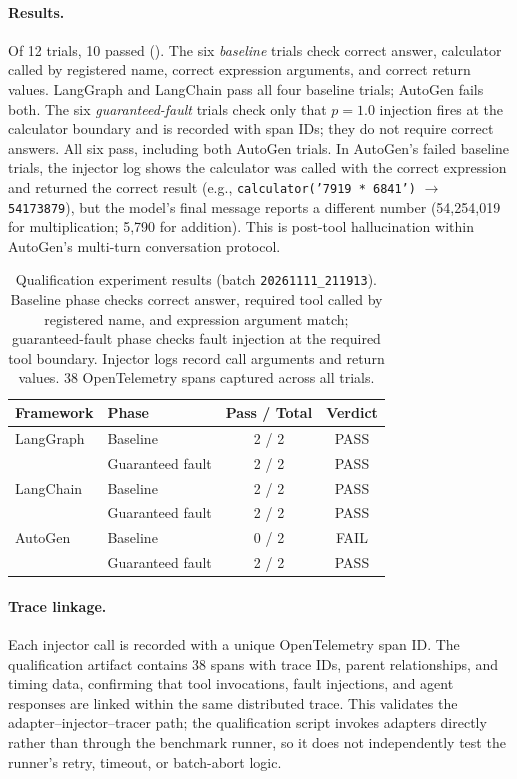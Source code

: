 \documentclass[make,article,submit,moreauthors,pdftex]{mdpi}
\begin{document}
{\color{orange}\paragraph{Results.} Of 12 trials, 10 passed (). The six \emph{baseline} trials check correct answer, calculator called by registered name, correct expression arguments, and correct return values. LangGraph and LangChain pass all four baseline trials; AutoGen fails both. The six \emph{guaranteed-fault} trials check only that $p = 1.0$ injection fires at the calculator boundary and is recorded with span IDs; they do not require correct answers. All six pass, including both AutoGen trials. In AutoGen's failed baseline trials, the injector log shows the calculator was called with the correct expression and returned the correct result (e.g., \texttt{calculator('7919 * 6841')} $\to$ \texttt{54173879}), but the model's final message reports a different number (54{,}254{,}019 for multiplication; 5{,}790 for addition). This is post-tool hallucination within AutoGen's multi-turn conversation protocol.}

\begin{table}[htbp]
\caption{Qualification experiment results (batch \texttt{20261111\_211913}). Baseline phase checks correct answer, required tool called by registered name, and expression argument match; guaranteed-fault phase checks fault injection at the required tool boundary. Injector logs record call arguments and return values. 38 OpenTelemetry spans captured across all trials.}\label{tab:qualification}
\centering
\begin{tabular}{llcc}
\toprule
\textbf{Framework} & \textbf{Phase} & \textbf{Pass / Total} & \textbf{Verdict} \\
\midrule
LangGraph  & Baseline          & 2 / 2 & PASS \\
           & Guaranteed fault  & 2 / 2 & PASS \\
LangChain  & Baseline          & 2 / 2 & PASS \\
           & Guaranteed fault  & 2 / 2 & PASS \\
AutoGen    & Baseline          & 0 / 2 & FAIL \\
           & Guaranteed fault  & 2 / 2 & PASS \\
\bottomrule
\end{tabular}
\end{table}

\paragraph{Trace linkage.} Each injector call is recorded with a unique OpenTelemetry span ID. The qualification artifact contains 38 spans with trace IDs, parent relationships, and timing data, confirming that tool invocations, fault injections, and agent responses are linked within the same distributed trace. This validates the adapter--injector--tracer path; the qualification script invokes adapters directly rather than through the benchmark runner, so it does not independently test the runner's retry, timeout, or batch-abort logic.
\end{document}
